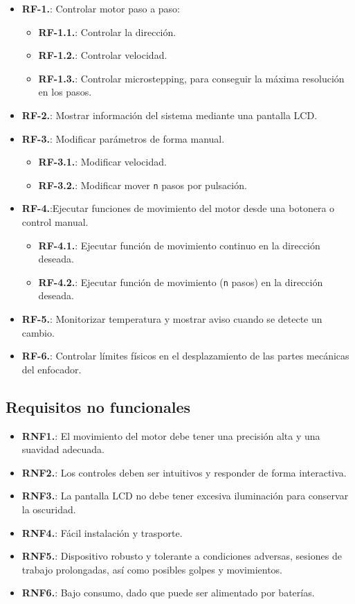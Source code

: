 \begin{itemize}
	\item \textbf{RF-1.}: Controlar motor paso a paso:
	\begin{itemize}
		\item \textbf{RF-1.1.}: Controlar la dirección.
		\item \textbf{RF-1.2.}: Controlar velocidad.
		\item \textbf{RF-1.3.}: Controlar microstepping, para conseguir la máxima resolución en los pasos. \cite{micros}
	\end{itemize} 	
		\item \textbf{RF-2.}: Mostrar información del sistema mediante una pantalla LCD.
		\item \textbf{RF-3.}: Modificar parámetros de forma manual.
	\begin{itemize}
		\item \textbf{RF-3.1.}: Modificar velocidad.
		\item \textbf{RF-3.2.}: Modificar mover \texttt{n} pasos por pulsación.
	\end{itemize}	
	\item \textbf{RF-4.}:Ejecutar funciones de movimiento del motor desde una botonera o control manual.
		\begin{itemize}
			\item \textbf{RF-4.1.}: Ejecutar función de movimiento continuo en la dirección deseada.
			\item \textbf{RF-4.2.}: Ejecutar función de movimiento (\texttt{n} pasos) en la dirección deseada. 
		\end{itemize}
	\item \textbf{RF-5.}: Monitorizar temperatura y mostrar aviso cuando se detecte un cambio.
	\item \textbf{RF-6.}: Controlar límites físicos en el desplazamiento de las partes mecánicas del enfocador.  	
\end{itemize}

\subsection{Requisitos no funcionales}

\begin{itemize}
	\item \textbf{RNF1.}: El movimiento del motor debe tener una precisión alta y una suavidad adecuada. 
	\item \textbf{RNF2.}: Los controles deben ser intuitivos y responder de forma interactiva. 
	\item \textbf{RNF3.}: La pantalla LCD no debe tener excesiva iluminación para conservar la oscuridad.
	\item \textbf{RNF4.}: Fácil instalación y trasporte.
	\item \textbf{RNF5.}: Dispositivo robusto y tolerante a condiciones adversas, sesiones de trabajo prolongadas, así como posibles golpes y movimientos.
	\item \textbf{RNF6.}: Bajo consumo, dado que puede ser alimentado por baterías.
\end{itemize}

